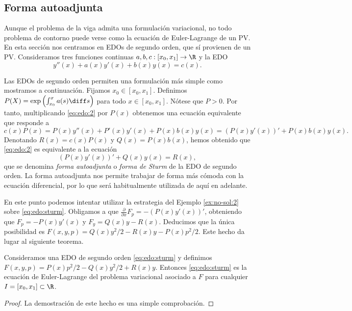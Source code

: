 \documentclass{article}
\begin{document}
\subsection{Forma autoadjunta}

Aunque el problema de la viga admita una formulación variacional, no todo problema de contorno puede
verse como la ecuación de Euler-Lagrange de un PV. En esta sección nos centramos en EDOs de segundo
orden, que sí provienen de un PV. Consideramos tres funciones continuas
$a, b, c : [x_0, x_1] \to \R$ y la EDO
\begin{equation} \label{eq:edo:2}
  y''(x) + a(x) y'(x) + b(x)y(x) = c(x).  \tag{E2}
\end{equation}

Las EDOs de segundo orden permiten una formulación más simple como mostramos a continuación. Fijamos
$x_0 \in [x_0, x_1]$. Definimos $P(X) = \exp\left(\int^x_{x_0} a(s) \diff s\right)$ para todo
$x \in [x_0, x_1]$. Nótese que $P > 0$. Por tanto, multiplicando \eqref{eq:edo:2} por $P(x)$
obtenemos una ecuación equivalente que responde a
\[c(x) P(x) = P(x)y''(x) + P'(x)y'(x) + P(x) b(x) y(x) = \left(P(x)y'(x)\right)' + P(x) b(x) y(x).\]
Denotando $R(x) = c(x) P(x)$ y $Q(x) = P(x) b(x)$, hemos obtenido que \eqref{eq:edo:2} es
equivalente a la ecuación
\begin{equation}
  \label{eq:edo:sturm}
  \left(P(x)y'(x)\right)' + Q(x) y(x) = R(x),
  \tag{S}
\end{equation}
que se denomina \emph{forma autoadjunta} o \emph{forma de Sturm} de la EDO de segundo orden. La
forma autoadjunta nos permite trabajar de forma más cómoda con la ecuación diferencial, por lo que
será habitualmente utilizada de aquí en adelante.

En este punto podemos intentar utilizar la estrategia del Ejemplo \ref{ex:no-sol:2} sobre
\eqref{eq:edo:sturm}. Obligamos a que $\frac{\partial}{\partial x} F_p = - \left(P(x)y'(x)\right)'$,
obteniendo que $F_p = -P(x)y'(x)$ y $F_y = Q(x)y-R(x)$. Deducimos que la única posibilidad es
$F(x,y,p) = Q(x)y^2/2 - R(x)y - P(x) p^2/2$. Este hecho da lugar al siguiente teorema.

\begin{thm} \label{thm:pv:sturm} Consideramos una EDO de segundo orden \eqref{eq:edo:sturm} y
  definimos $F(x,y,p) = P(x) p^2/2 - Q(x) y^2/2 + R(x)y$. Entonces \eqref{eq:edo:sturm} es la
  ecuación de Euler-Lagrange del problema variacional asociado a $F$ para cualquier
  $I = [x_0, x_1] \subset \R$.
\end{thm}
\begin{proof}
  La demostración de este hecho es una simple comprobación.
\end{proof}
\end{document}
